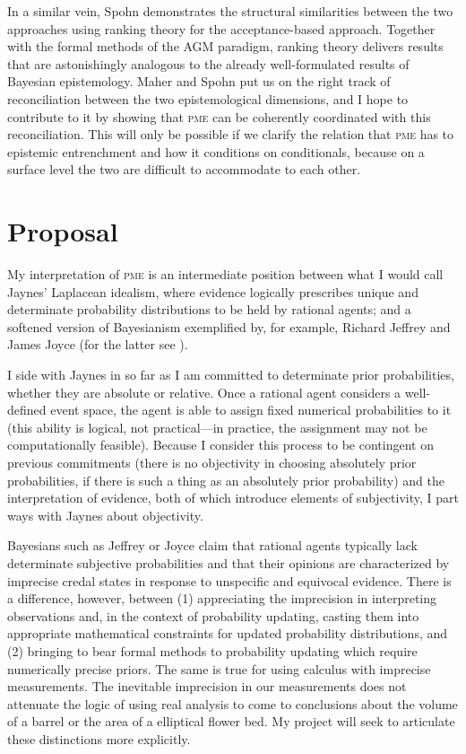 \documentclass[phd,12pt,oneside]{ubcthesis}
\begin{document}
In a similar vein, Spohn demonstrates the structural similarities
between the two approaches using ranking theory for the
acceptance-based approach. Together with the formal methods of the AGM
paradigm, ranking theory delivers results that are astonishingly
analogous to the already well-formulated results of Bayesian
epistemology. Maher and Spohn put us on the right track of
reconciliation between the two epistemological dimensions, and I hope
to contribute to it by showing that \textsc{pme} can be coherently
coordinated with this reconciliation. This will only be possible if we
clarify the relation that \textsc{pme} has to epistemic
entrenchment and how it conditions on conditionals, because on a
surface level the two are difficult to accommodate to each other.

\section{Proposal}
\label{sec:maifeida}

My interpretation of \textsc{pme} is an intermediate position
between what I would call Jaynes' Laplacean idealism, where evidence
logically prescribes unique and determinate probability distributions
to be held by rational agents; and a softened version of Bayesianism
exemplified by, for example, Richard Jeffrey and James Joyce (for the
latter see ). 

I side with Jaynes in so far as I am committed to determinate prior
probabilities, whether they are absolute or relative. Once a rational
agent considers a well-defined event space, the agent is able to
assign fixed numerical probabilities to it (this ability is logical,
not practical---in practice, the assignment may not be computationally
feasible). Because I consider this process to be contingent on
previous commitments (there is no objectivity in choosing absolutely
prior probabilities, if there is such a thing as an absolutely prior
probability) and the interpretation of evidence, both of which
introduce elements of subjectivity, I part ways with Jaynes about
objectivity.

 Bayesians such as Jeffrey or Joyce claim that
rational agents typically lack determinate subjective probabilities
and that their opinions are characterized by imprecise credal states
in response to unspecific and equivocal evidence. There is a
difference, however, between (1) appreciating the imprecision in
interpreting observations and, in the context of probability updating,
casting them into appropriate mathematical constraints for updated
probability distributions, and (2) bringing to bear formal methods to
probability updating which require numerically precise priors. The
same is true for using calculus with imprecise measurements. The
inevitable imprecision in our measurements does not attenuate the
logic of using real analysis to come to conclusions about the volume
of a barrel or the area of a elliptical flower bed. My project will
seek to articulate these distinctions more explicitly.
\end{document}
